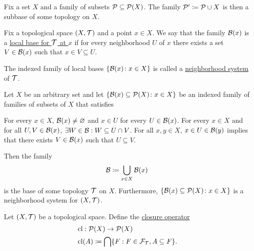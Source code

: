 \begin{proposition}
  Fix a set $X$ and a family of subsets $\mathcal P \subseteq \operatorname{\mathcal P}(X)$. The family $\mathcal P' \coloneqq \mathcal P \cup X$ is then a subbase of some topology on $X$.
\end{proposition}

\begin{definition}\label{def:topological_local_base}\cite[31]{Lectures:general_topology}
  Fix a topological space $(X, \mathcal T)$ and a point $x \in X$. We say that the family $\mathcal B(x)$ is a \uline{local base for $\mathcal T$ at $x$} if for every neighborhood $U$ of $x$ there exists a set $V \in \mathcal B(x)$ such that $x \in V \subseteq U$.

  The indexed family of local bases $\{ \mathcal B(x) \colon x \in X \}$ is called a \uline{neighborhood system} of $\mathcal T$.
\end{definition}

\begin{proposition}\label{thm:topological_local_base_axioms}\cite[31]{Lectures:general_topology}
  Let $X$ be an arbitrary set and let $\{ \mathcal B(x) \subseteq \operatorname{\mathcal P}(X) \colon x \in X \}$ be an indexed family of families of subsets of $X$ that satisfies
  \begin{description}
     For every $x \in X$, $\mathcal B(x) \neq \varnothing$ and $x \in U$ for every $U \in \mathcal B(x)$.
     For every $x \in X$ and for all $U, V \in \mathcal B(x)$, $\exists W \in \mathcal B: W \subseteq U \cap V$.
     For all $x, y \in X$, $x \in U \in \mathcal B(y)$ implies that there exists $V \in \mathcal B(x)$ such that $U \subseteq V$.
  \end{description}

  Then the family
  \begin{align*}
    \mathcal B \coloneqq \bigcup_{x \in X} \mathcal B(x)
  \end{align*}
  is the base of some topology $\mathcal T$ on $X$. Furthermore, $\{ \mathcal B(x) \subseteq \operatorname{\mathcal P}(X) \colon x \in X \}$ is a neighborhood system for $(X, \mathcal T)$.
\end{proposition}

\begin{definition}\label{def:closure_operator}\cite[35]{Lectures:general_topology}
  Let $(X, \mathcal T)$ be a topological space. Define the \uline{closure operator}
  \begin{align*}
    &\operatorname{cl}: \operatorname{\mathcal P}(X) \to \operatorname{\mathcal P}(X) \\
    &\operatorname{cl}(A) \coloneqq \bigcap \{ F : F \in \mathcal F_{\mathcal T}, A \subseteq F \}.
  \end{align*}
\end{definition}

